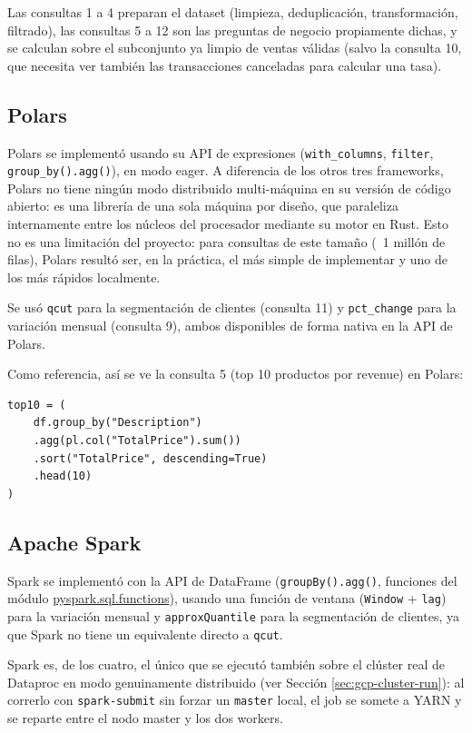 Las consultas 1 a 4 preparan el dataset (limpieza, deduplicación, transformación, filtrado), las consultas 5 a 12 son las preguntas de negocio propiamente dichas, y se calculan sobre el subconjunto ya limpio de ventas válidas (salvo la consulta 10, que necesita ver también las transacciones canceladas para calcular una tasa).

\subsection{Polars}

Polars se implementó usando su API de expresiones (\texttt{with\_columns}, \texttt{filter}, \texttt{group\_by().agg()}), en modo eager. A diferencia de los otros tres frameworks, Polars no tiene ningún modo distribuido multi-máquina en su versión de código abierto: es una librería de una sola máquina por diseño, que paraleliza internamente entre los núcleos del procesador mediante su motor en Rust. Esto no es una limitación del proyecto: para consultas de este tamaño (~1 millón de filas), Polars resultó ser, en la práctica, el más simple de implementar y uno de los más rápidos localmente.

Se usó \texttt{qcut} para la segmentación de clientes (consulta 11) y \texttt{pct\_change} para la variación mensual (consulta 9), ambos disponibles de forma nativa en la API de Polars.

Como referencia, así se ve la consulta 5 (top 10 productos por revenue) en Polars:

\begin{verbatim}
top10 = (
    df.group_by("Description")
    .agg(pl.col("TotalPrice").sum())
    .sort("TotalPrice", descending=True)
    .head(10)
)
\end{verbatim}

\subsection{Apache Spark}

Spark se implementó con la API de DataFrame (\texttt{groupBy().agg()}, funciones del módulo \url{pyspark.sql.functions}), usando una función de ventana (\texttt{Window} + \texttt{lag}) para la variación mensual y \texttt{approxQuantile} para la segmentación de clientes, ya que Spark no tiene un equivalente directo a \texttt{qcut}.

Spark es, de los cuatro, el único que se ejecutó también sobre el clúster real de Dataproc en modo genuinamente distribuido (ver Sección \ref{sec:gcp-cluster-run}): al correrlo con \texttt{spark-submit} sin forzar un \texttt{master} local, el job se somete a YARN y se reparte entre el nodo master y los dos workers.

